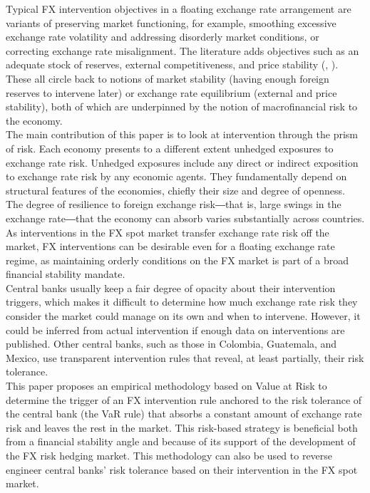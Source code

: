 \documentclass[11pt]{article}
\begin{document}
Typical FX intervention objectives in a floating exchange rate arrangement are
variants of  preserving market  functioning, for example,  smoothing excessive
exchange  rate  volatility and  addressing  disorderly  market conditions,  or
correcting exchange rate misalignment. The  literature adds objectives such as
an adequate stock  of reserves, external competitiveness,  and price stability
(\cite{patel2019},  \cite{chamon2019}). These  all circle  back to  notions of
market  stability  (having enough  foreign  reserves  to intervene  later)  or
exchange rate  equilibrium (external and  price stability), both of  which are
underpinned by the notion of macrofinancial risk to the economy.\\

The main  contribution of this  paper is to  look at intervention  through the
prism of risk. Each economy presents  to a different extent unhedged exposures
to  exchange rate  risk. Unhedged  exposures  include any  direct or  indirect
exposition to  exchange rate risk  by any economic agents.  They fundamentally
depend on structural features of the  economies, chiefly their size and degree
of openness. The degree of resilience  to foreign exchange risk―that is, large
swings in the  exchange rate―that the economy can  absorb varies substantially
across countries.  As interventions  in the FX  spot market  transfer exchange
rate  risk off  the  market, FX  interventions  can be  desirable  even for  a
floating exchange  rate regime,  as maintaining orderly  conditions on  the FX
market is part of a broad financial stability mandate.\\

Central banks usually  keep a fair degree of opacity  about their intervention
triggers, which  makes it difficult to  determine how much exchange  rate risk
they   consider  the   market   could  manage   on  its   own   and  when   to
intervene. However,  it could be  inferred from actual intervention  if enough
data on  interventions are published.  Other  central banks, such as  those in
Colombia,   Guatemala,  and   Mexico,  use   transparent  intervention   rules
\citep{chamon2019} that reveal, at least partially, their risk tolerance.\\

This  paper proposes  an  empirical  methodology based  on  Value  at Risk  to
determine  the  trigger of  an  FX  intervention  rule  anchored to  the  risk
tolerance of the central bank (the VaR rule) that absorbs a constant amount of
exchange rate risk and leaves the rest in the market. This risk-based strategy
is beneficial both from a financial stability angle and because of its support
of the development of the FX risk hedging market. This methodology can also be
used  to  reverse  engineer  central  banks' risk  tolerance  based  on  their
intervention in the FX spot market.\\
\end{document}
